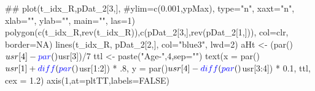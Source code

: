 \documentclass[11pt,]{article}
\newenvironment{Shaded}{}{}
\newcommand{\KeywordTok}[1]{\textcolor[rgb]{0.00,0.00,1.00}{#1}}
\newcommand{\DataTypeTok}[1]{#1}
\newcommand{\DecValTok}[1]{#1}
\newcommand{\FloatTok}[1]{#1}
\newcommand{\StringTok}[1]{\textcolor[rgb]{0.00,0.50,0.50}{#1}}
\newcommand{\CommentTok}[1]{\textcolor[rgb]{0.00,0.50,0.00}{#1}}
\newcommand{\OtherTok}[1]{\textcolor[rgb]{1.00,0.25,0.00}{#1}}
\newcommand{\OperatorTok}[1]{#1}
\newcommand{\NormalTok}[1]{#1}
\begin{document}
\begin{Shaded}
\begin{Highlighting}[]
\NormalTok{    ##}
        \KeywordTok{plot}\NormalTok{(t_idx_R,pDat_}\DecValTok{2}\NormalTok{[}\DecValTok{3}\NormalTok{,], }\CommentTok{#ylim=c(0.001,ypMax),}
         \DataTypeTok{type=}\StringTok{"n"}\NormalTok{, }\DataTypeTok{xaxt=}\StringTok{"n"}\NormalTok{, }\DataTypeTok{xlab=}\StringTok{""}\NormalTok{, }\DataTypeTok{ylab=}\StringTok{""}\NormalTok{, }\DataTypeTok{main=}\StringTok{""}\NormalTok{, }\DataTypeTok{las=}\DecValTok{1}\NormalTok{)}
    \KeywordTok{polygon}\NormalTok{(}\KeywordTok{c}\NormalTok{(t_idx_R,}\KeywordTok{rev}\NormalTok{(t_idx_R)),}\KeywordTok{c}\NormalTok{(pDat_}\DecValTok{2}\NormalTok{[}\DecValTok{3}\NormalTok{,],}\KeywordTok{rev}\NormalTok{(pDat_}\DecValTok{2}\NormalTok{[}\DecValTok{1}\NormalTok{,])), }\DataTypeTok{col=}\NormalTok{clr, }\DataTypeTok{border=}\OtherTok{NA}\NormalTok{)}
    \KeywordTok{lines}\NormalTok{(t_idx_R, pDat_}\DecValTok{2}\NormalTok{[}\DecValTok{2}\NormalTok{,], }\DataTypeTok{col=}\StringTok{"blue3"}\NormalTok{, }\DataTypeTok{lwd=}\DecValTok{2}\NormalTok{)}
\NormalTok{    aHt <-}\StringTok{ }\NormalTok{(}\KeywordTok{par}\NormalTok{()}\OperatorTok{$}\NormalTok{usr[}\DecValTok{4}\NormalTok{]}\OperatorTok{-}\KeywordTok{par}\NormalTok{()}\OperatorTok{$}\NormalTok{usr[}\DecValTok{3}\NormalTok{])}\OperatorTok{/}\DecValTok{7}
\NormalTok{    ttl <-}\StringTok{ }\KeywordTok{paste}\NormalTok{(}\StringTok{"Age-"}\NormalTok{,}\DecValTok{4}\NormalTok{,}\DataTypeTok{sep=}\StringTok{""}\NormalTok{)}
    \KeywordTok{text}\NormalTok{(}\DataTypeTok{x =} \KeywordTok{par}\NormalTok{()}\OperatorTok{$}\NormalTok{usr[}\DecValTok{1}\NormalTok{] }\OperatorTok{+}\StringTok{ }\KeywordTok{diff}\NormalTok{(}\KeywordTok{par}\NormalTok{()}\OperatorTok{$}\NormalTok{usr[}\DecValTok{1}\OperatorTok{:}\DecValTok{2}\NormalTok{]) }\OperatorTok{*}\StringTok{ }\NormalTok{.}\DecValTok{8}\NormalTok{,}
       \DataTypeTok{y =} \KeywordTok{par}\NormalTok{()}\OperatorTok{$}\NormalTok{usr[}\DecValTok{4}\NormalTok{] }\OperatorTok{-}\StringTok{ }\KeywordTok{diff}\NormalTok{(}\KeywordTok{par}\NormalTok{()}\OperatorTok{$}\NormalTok{usr[}\DecValTok{3}\OperatorTok{:}\DecValTok{4}\NormalTok{]) }\OperatorTok{*}\StringTok{ }\FloatTok{0.1}\NormalTok{,}
\NormalTok{       ttl,}
       \DataTypeTok{cex =} \FloatTok{1.2}\NormalTok{)}
    \KeywordTok{axis}\NormalTok{(}\DecValTok{1}\NormalTok{,}\DataTypeTok{at=}\NormalTok{pltTT,}\DataTypeTok{labels=}\OtherTok{FALSE}\NormalTok{)}
\end{Highlighting}
\end{Shaded}
\end{document}

